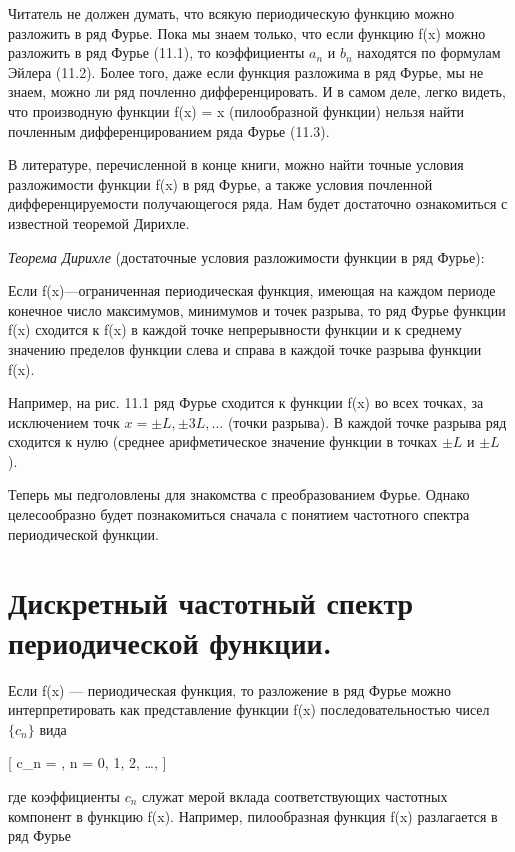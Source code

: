 \documentclass[
  ukrainian,
]{article}
\begin{document}
Читатель не должен думать, что всякую периодическую функцию можно
разложить в ряд Фурье. Пока мы знаем только, что если функцию f(x) можно
разложить в ряд Фурье (11.1), то коэффициенты \(a_n\) и \(b_n\)
находятся по формулам Эйлера (11.2). Более того, даже если функция
разложима в ряд Фурье, мы не знаем, можно ли ряд почленно
дифференцировать. И в самом деле, легко видеть, что производную функции
f(x) = x (пилообразной функции) нельзя найти почленным
дифференцированием ряда Фурье (11.3).

В литературе, перечисленной в конце книги, можно найти точные условия
разложимости функции f(x) в ряд Фурье, а также условия почленной
дифференцируемости получающегося ряда. Нам будет достаточно ознакомиться
с известной теоремой Дирихле.

\emph{Теорема Дирихле} (достаточные условия разложимости функции в ряд
Фурье):

Если f(x)---ограниченная периодическая функция, имеющая на каждом
периоде конечное число максимумов, минимумов и точек разрыва, то ряд
Фурье функции f(x) сходится к f(x) в каждой точке непрерывности функции
и к среднему значению пределов функции слева и справа в каждой точке
разрыва функции f(x).

Например, на рис. 11.1 ряд Фурье сходится к функции f(x) во всех точках,
за исключением точк \(x=\pm L, \pm 3L, \ldots\) (точки разрыва). В
каждой точке разрыва ряд сходится к нулю (среднее арифметическое
значение функции в точках \(\pm L\) и \(\pm L\) ).

Теперь мы педголовлены для знакомства с преобразованием Фурье. Однако
целесообразно будет познакомиться сначала с понятием частотного спектра
периодической функции.

\section{Дискретный частотный спектр периодической
функции.}\label{ux434ux438ux441ux43aux440ux435ux442ux43dux44bux439-ux447ux430ux441ux442ux43eux442ux43dux44bux439-ux441ux43fux435ux43aux442ux440-ux43fux435ux440ux438ux43eux434ux438ux447ux435ux441ux43aux43eux439-ux444ux443ux43dux43aux446ux438ux438.}

Если f(x) --- периодическая функция, то разложение в ряд Фурье можно
интерпретировать как представление функции f(x) последовательностью
чисел \(\{c_n\}\) вида

{[} c\_n = , \quad n = 0, 1, 2, \dots, {]}

где коэффициенты \(c_n\) служат мерой вклада соответствующих частотных
компонент в функцию f(x). Например, пилообразная функция f(x)
разлагается в ряд Фурье
\end{document}
